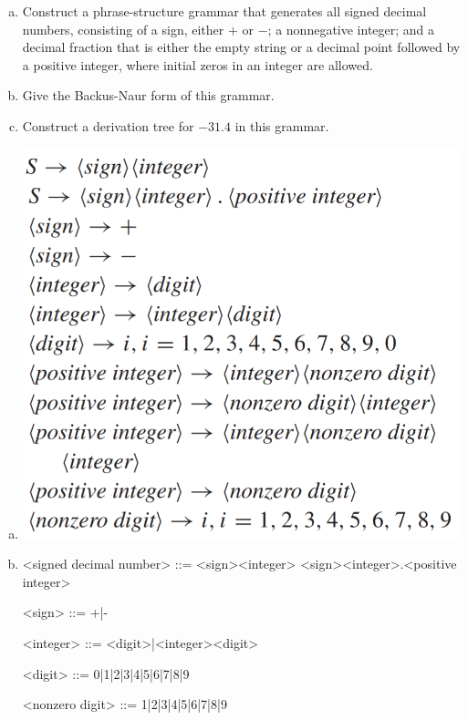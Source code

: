 \documentclass[../main.tex]{subfiles}
\begin{document}
\begin{enumerate}[a)]
	\item Construct a phrase-structure grammar that generates all signed decimal numbers,
		consisting of a sign, either $+$ or $-$;
		a nonnegative integer;
		and a decimal fraction that is either the empty string or a decimal point followed by a positive integer,
		where initial zeros in an integer are allowed.
	\item Give the Backus-Naur form of this grammar.
	\item Construct a derivation tree for $-31.4$ in this grammar.
\end{enumerate}

\solution
\begin{enumerate}[a)]
	\item \includegraphics[scale=0.2]{img/29aA.png}
	\item 
		\begin{grammar}
			<signed decimal number> ::= <sign><integer>
			\alt <sign><integer>.<positive integer>

			<sign> ::= +|-

			<integer> ::= <digit>|<integer><digit>

			<digit> ::= 0|1|2|3|4|5|6|7|8|9

			<nonzero digit> ::= 1|2|3|4|5|6|7|8|9


\end{grammar}
\end{enumerate}
\end{document}

